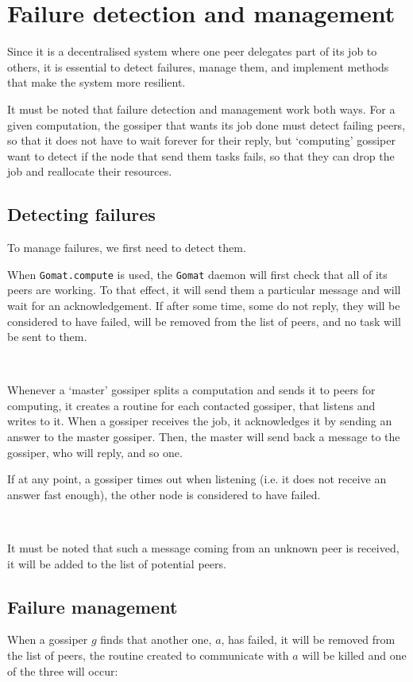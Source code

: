 \documentclass[a4paper,12pt]{article}
\newcommand{\Gomat}{\texttt{Gomat}\xspace}
\begin{document}
    \section{Failure detection and management}
    Since it is a decentralised system where one peer delegates part of its job to others, it is essential to detect failures, manage them, and implement methods that make the system more resilient.

    It must be noted that failure detection and management work both ways. For a given computation, the gossiper that wants its job done must detect failing peers, so that it does not have to wait forever for their reply, but ‘computing’ gossiper want to detect if the node that send them tasks fails, so that they can drop the job and reallocate their resources.

    \subsection{Detecting failures}
    To manage failures, we first need to detect them.

    When \texttt{Gomat.compute} is used, the \Gomat daemon will first check that all of its peers are working. To that effect, it will send them a particular message and will wait for an acknowledgement. If after some time, some do not reply, they will be considered to have failed, will be removed from the list of peers, and no task will be sent to them.

~~

    Whenever a ‘master’ gossiper splits a computation and sends it to peers for computing, it creates a routine for each contacted gossiper, that listens and writes to it.
When a gossiper receives the job, it acknowledges it by sending an answer to the master gossiper.
Then, the master will send back a message to the gossiper, who will reply, and so one.

    If at any point, a gossiper times out when listening (i.e. it does not receive an answer fast enough), the other node is considered to have failed.

~~

    It must be noted that such a message coming from an unknown peer is received, it will be added to the list of potential peers.

    \subsection{Failure management}
    When a gossiper $g$ finds that another one, $a$, has failed, it will be removed from the list of peers, the routine created to communicate with $a$ will be killed and one of the three will occur:
\end{document}

